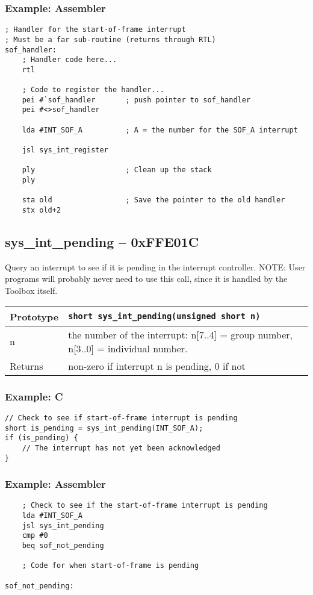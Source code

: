 \subsubsection*{Example: Assembler}
\begin{verbatim}
; Handler for the start-of-frame interrupt
; Must be a far sub-routine (returns through RTL)
sof_handler:
    ; Handler code here...
    rtl

    ; Code to register the handler...
    pei #`sof_handler       ; push pointer to sof_handler
    pei #<>sof_handler

    lda #INT_SOF_A          ; A = the number for the SOF_A interrupt
	
    jsl sys_int_register

    ply                     ; Clean up the stack
    ply

    sta old                 ; Save the pointer to the old handler
    stx old+2
\end{verbatim}

\subsection*{sys\_int\_pending -- 0xFFE01C}
Query an interrupt to see if it is pending in the interrupt controller.
NOTE: User programs will probably never need to use this call, since it is handled by the Toolbox itself.

\bigskip

\begin{tabular}{|l||l|} \hline
Prototype & \lstinline!short sys_int_pending(unsigned short n)! \\ \hline
n & the number of the interrupt: n[7..4] = group number, n[3..0] = individual number. \\ \hline
Returns & non-zero if interrupt n is pending, 0 if not \\ \hline
\end{tabular}

\subsubsection*{Example: C}
\begin{lstlisting}
// Check to see if start-of-frame interrupt is pending
short is_pending = sys_int_pending(INT_SOF_A);
if (is_pending) {
	// The interrupt has not yet been acknowledged
}
\end{lstlisting}

\subsubsection*{Example: Assembler}
\begin{verbatim}
    ; Check to see if the start-of-frame interrupt is pending
    lda #INT_SOF_A
    jsl sys_int_pending
    cmp #0
    beq sof_not_pending

    ; Code for when start-of-frame is pending

sof_not_pending:
\end{verbatim}


